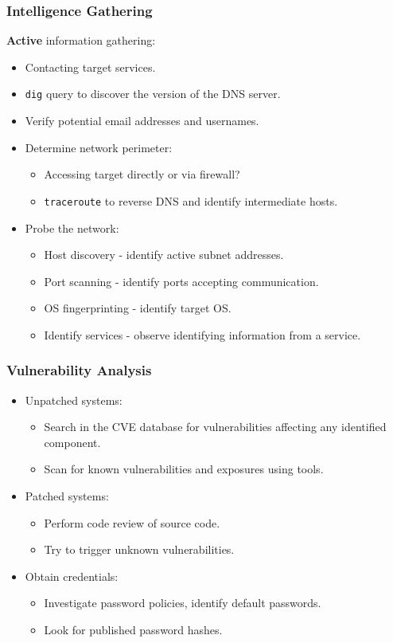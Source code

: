 \documentclass[11pt]{article}
\begin{document}
\subsubsection{Intelligence Gathering}
\textbf{Active} information gathering:
\begin{itemize}
  \item Contacting target services.
  \item \texttt{dig} query to discover the version of the DNS server.
  \item Verify potential email addresses and usernames.
  \item Determine network perimeter:
    \begin{itemize}
      \item Accessing target directly or via firewall?
      \item \texttt{traceroute} to reverse DNS and identify intermediate hosts.
    \end{itemize}
  \item Probe the network:
    \begin{itemize}
      \item Host discovery - identify active subnet addresses.
      \item Port scanning - identify ports accepting communication.
      \item OS fingerprinting - identify target OS.
      \item Identify services - observe identifying information from a service.
    \end{itemize}
\end{itemize}

\subsubsection{Vulnerability Analysis}
\begin{itemize}
  \item Unpatched systems:
    \begin{itemize}
      \item Search in the CVE database for vulnerabilities affecting any identified component.
      \item Scan for known vulnerabilities and exposures using tools.
    \end{itemize}
  \item Patched systems:
    \begin{itemize}
      \item Perform code review of source code.
      \item Try to trigger unknown vulnerabilities.
    \end{itemize}
  \item Obtain credentials:
    \begin{itemize}
      \item Investigate password policies, identify default passwords.
      \item Look for published password hashes.
    \end{itemize}
\end{itemize}
\end{document}
